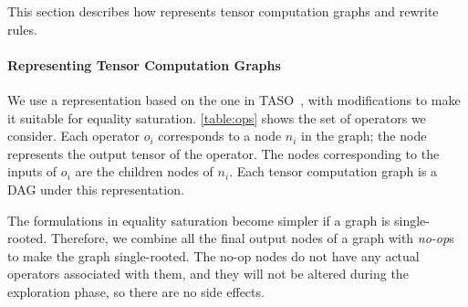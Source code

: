 This section describes how \ourname{} represents tensor computation graphs and rewrite rules.

\paragraph{Representing Tensor Computation Graphs}
\label{sec:language}

We use a representation based on the one in TASO~\cite{taso},
 with modifications to make it suitable for equality saturation.
\autoref{table:ops} shows the set of operators we consider.
Each operator $o_i$ corresponds to a node $n_i$ in the graph; the node represents the output tensor of the operator.
The nodes corresponding to the inputs of $o_i$ are the children nodes of $n_i$.
Each tensor computation graph is a DAG under this representation.

The formulations in equality saturation become simpler if a graph is
single-rooted. Therefore, we combine all the final output nodes of a
graph with \emph{no-op}s to make the graph single-rooted. The no-op
nodes do not have any actual operators associated with them, and they
will not be altered during the exploration phase, so there are no side
effects.


